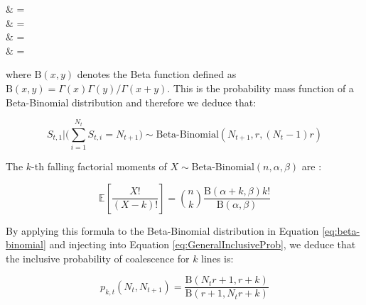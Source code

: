 \documentclass{article}
\let\oldalign\align
\let\oldendalign\endalign
\renewenvironment{align}{\linenomathNonumbers\oldalign}{\oldendalign\endlinenomath}
\renewcommand{\eqref}[1]{\ref{#1}}
\begin{document}
{\allowdisplaybreaks
	\begin{align}
		\bigg[ S_{t,1} = s \bigg| \sum_{i=1}^{N_t} S_{t,i} = N_{t+1} \bigg]
			& =  \nonumber\\
			& =  \nonumber\\
			& =    \nonumber\\
			& =  \label{eq:derivBetaBinom}
	\end{align}
}

\noindent where  $\mathrm{B}(x,y)$ denotes the Beta function defined as $\mathrm{B}(x,y)=\Gamma(x)\Gamma(y)/\Gamma(x+y)$. This is the probability mass function of a Beta-Binomial distribution and therefore we deduce that:

\begin{equation}
S_{t,1} \bigg| \bigg(\sum_{i=1}^{N_t} S_{t,i} = N_{t+1} \bigg) \sim \text{Beta-Binomial}(N_{t+1},r, (N_t - 1)r)
\label{eq:beta-binomial}
\end{equation}

The $k$-th falling factorial moments of $X \sim \text{Beta-Binomial}(n,\alpha,\beta)$ are \citep{Tripathi1994}:

\begin{equation}
	\mathbb{E}\left[\frac{X!}{(X-k)!}\right]=\binom{n}{k} \frac{\mathrm{B}(\alpha+k,\beta)k!}{\mathrm{B}(\alpha,\beta)}
\end{equation}

By applying this formula to the Beta-Binomial distribution in Equation \eqref{eq:beta-binomial}
and injecting into Equation \eqref{eq:GeneralInclusiveProb}, we deduce that the inclusive probability of coalescence for $k$ lines is:

\begin{equation}
p_{k,t}(N_t, N_{t+1})=
\frac{\mathrm{B}(N_t r+1,r+k)}{\mathrm{B}(r+1,N_t r+k)}
\label{eq:NegBinInclusiveProb}
\end{equation}
\end{document}
